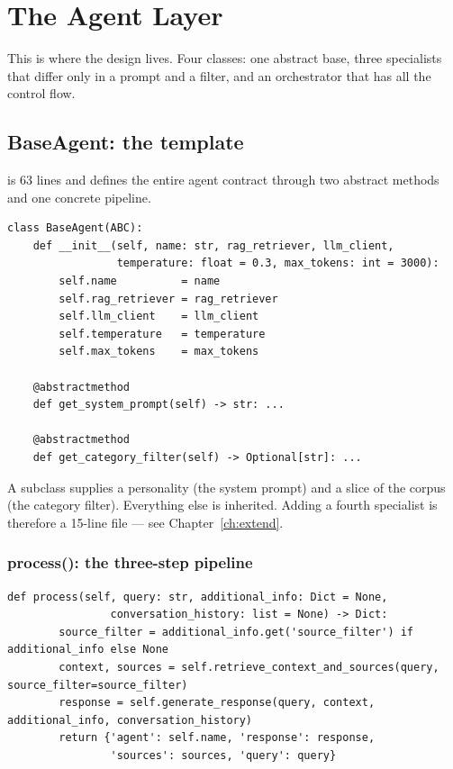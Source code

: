 \chapter{The Agent Layer}
\label{ch:agents}

This is where the design lives. Four classes: one abstract base, three specialists that differ only in a prompt and a filter, and an orchestrator that has all the control flow.

\section{BaseAgent: the template}

 is 63 lines and defines the entire agent contract through two abstract methods and one concrete pipeline.

\begin{lstlisting}[style=py,firstnumber=5]
class BaseAgent(ABC):
    def __init__(self, name: str, rag_retriever, llm_client,
                 temperature: float = 0.3, max_tokens: int = 3000):
        self.name          = name
        self.rag_retriever = rag_retriever
        self.llm_client    = llm_client
        self.temperature   = temperature
        self.max_tokens    = max_tokens

    @abstractmethod
    def get_system_prompt(self) -> str: ...

    @abstractmethod
    def get_category_filter(self) -> Optional[str]: ...
\end{lstlisting}

A subclass supplies a personality (the system prompt) and a slice of the corpus (the category filter). Everything else is inherited. Adding a fourth specialist is therefore a 15-line file --- see Chapter~\ref{ch:extend}.

\subsection{process(): the three-step pipeline}

\begin{lstlisting}[style=py,firstnumber=59]
    def process(self, query: str, additional_info: Dict = None,
                conversation_history: list = None) -> Dict:
        source_filter = additional_info.get('source_filter') if additional_info else None
        context, sources = self.retrieve_context_and_sources(query, source_filter=source_filter)
        response = self.generate_response(query, context, additional_info, conversation_history)
        return {'agent': self.name, 'response': response,
                'sources': sources, 'query': query}
\end{lstlisting}

